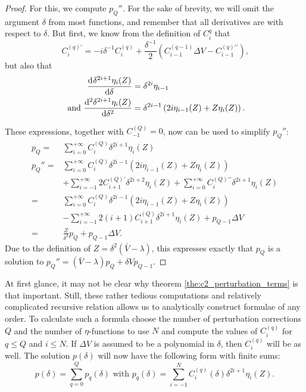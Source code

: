 \begin{proof}
For this, we compute $p_Q''$. For the sake of brevity, we will omit the argument $\delta$ from most functions, and remember that all derivatives are with respect to $\delta$. But first, we know from the definition of $C_i^q$ that
$$
    C_i^{(q)\prime} = -i \delta^{-1} C_i^{(q)} + \frac{\delta^{-1}}{2}\left(C^{(q-1)}_{i-1}\Delta V - C^{(q)\prime\prime}_{i-1}\right)\text{,}
$$
but also that
\begin{align*}
    {\dv[]{\delta^{2i+1}\eta_i(Z)}{\delta}}               & = \delta^{2i} \eta_{i-1}                                         \\
    \text{ and } {\dv[2]{\delta^{2i+1}\eta_i(Z)}{\delta}} & = \delta^{2i-1}\left(2i\eta_{i-1}(Z) + Z\eta_i(Z)\right)\text{.}
\end{align*}

\begingroup
\allowdisplaybreaks
These expressions, together with $C_{-1}^{(Q)} = 0$, now can be used to simplify $p_Q''$:
\begin{align*}
    p_Q =   & \sum_{i=0}^{+\infty} C_{i}^{(Q)} \delta^{2i + 1} \eta_{i}(Z)                                                                              \\
    p_Q'' = & \sum_{i=0}^{+\infty} C_i^{(Q)}\delta^{2i-1}\left(2i\eta_{i-1}(Z) + Z\eta_i(Z)\right)                                                      \\
            & + \sum_{i=-1}^{+\infty} 2C_{i+1}^{(Q)\prime}\delta^{2i+2}\eta_{i}(Z) + \sum_{i=0}^{+\infty} C_i^{(Q)\prime\prime}\delta^{2i+1}\eta_{i}(Z) \\
    =       & \sum_{i=0}^{+\infty} C_i^{(Q)}\delta^{2i-1}\left(2i\eta_{i-1}(Z) + Z\eta_i(Z)\right)                                                      \\
            & - \sum_{i=-1}^{+\infty} 2(i+1)C_{i+1}^{(Q)}\delta^{2i+1}\eta_{i}(Z) + p_{Q-1} \Delta V                                                    \\
    =       & \frac{Z}{\delta^2}p_Q + p_{Q-1} \Delta V \text{.}
\end{align*}
\endgroup
Due to the definition of $Z = \delta^2(\bar{V} - \lambda)$, this expresses exactly that $p_Q$ is a solution to $p_Q'' = (\bar{V} - \lambda)p_Q + \delta V p_{Q-1}$.
\end{proof}

At first glance, it may not be clear why theorem \ref{the:c2_perturbation_terms} is that important. Still, these rather tedious computations and relatively complicated recursive relation allows us to analytically construct formulae of any order. To calculate such a formula choose the number of perturbation corrections $Q$ and the number of $\eta$-functions to use $N$ and compute the values of $C_{i}^{(q)}$ for $q \leq Q$ and $i \leq N$. If $\Delta V$ is assumed to be a polynomial in $\delta$, then $C_{i}^{(q)}$ will be as well. The solution $p(\delta)$ will now have the following form with finite sums:
$$
    p(\delta) = \sum_{q=0}^{Q} p_q(\delta) \text{ with } p_q(\delta) = \sum_{i=-1}^{N} C_{i}^{(q)}(\delta) \delta^{2i+1} \eta_i(Z) \text{.}
$$

